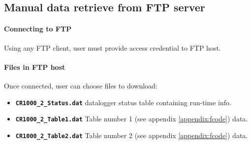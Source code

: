 \subsection{Manual data retrieve from FTP server}
\paragraph{Connecting to FTP}
Using any FTP client, user must provide access credential to FTP host.
\paragraph{Files in FTP host}
Once connected, user can choose files to download:
\begin{itemize}
	\item \texttt{\bfseries CR1000\_2\_Status.dat}    datalogger status table containing run-time info.
	\item \texttt{\bfseries CR1000\_2\_Table1.dat}    Table number 1 (see appendix \ref{appendix:fcode}) data.
	\item \texttt{\bfseries CR1000\_2\_Table2.dat}    Table number 2 (see appendix \ref{appendix:fcode}) data.
\end{itemize}